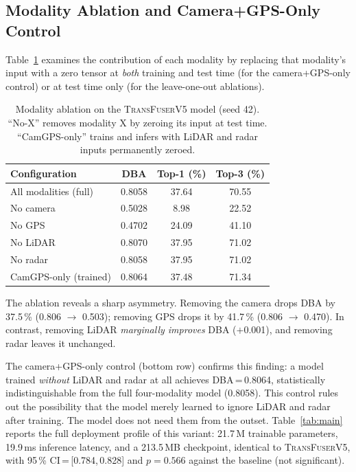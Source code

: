 \documentclass[journal,10pt,twoside]{IEEEtran}
\newcommand{\ours}{\textsc{TransFuserV5}}
\begin{document}
\subsection{Modality Ablation and Camera+GPS-Only Control}

Table~\ref{tab:ablation} examines the contribution of each modality by
replacing that modality's input with a zero tensor at \emph{both} training
and test time (for the camera+GPS-only control) or at test time only
(for the leave-one-out ablations).

\begin{table}[t]
\centering
\caption{%
  Modality ablation on the \ours{} model (seed 42). ``No-X'' removes modality X
  by zeroing its input at test time. ``CamGPS-only'' trains and infers with
  LiDAR and radar inputs permanently zeroed.%
}
\label{tab:ablation}
\renewcommand{\arraystretch}{1.15}
\begin{tabular}{lccc}
\toprule
\textbf{Configuration} & \textbf{DBA} & \textbf{Top-1 (\%)} & \textbf{Top-3 (\%)} \\
\midrule
All modalities (full)  & 0.8058 & 37.64 & 70.55 \\
\midrule
No camera              & 0.5028 & 8.98  & 22.52 \\
No GPS                 & 0.4702 & 24.09 & 41.10 \\
No LiDAR               & 0.8070 & 37.95 & 71.02 \\
No radar               & 0.8058 & 37.95 & 71.02 \\
\midrule
CamGPS-only (trained)  & 0.8064 & 37.48 & 71.34 \\
\bottomrule
\end{tabular}
\end{table}

The ablation reveals a sharp asymmetry. Removing the camera drops DBA by
37.5\,\% (0.806 $\to$ 0.503); removing GPS drops it by 41.7\,\% (0.806 $\to$
0.470). In contrast, removing LiDAR \emph{marginally improves} DBA
($+$0.001), and removing radar leaves it unchanged.

The camera+GPS-only control (bottom row) confirms this finding: a model
trained \emph{without} LiDAR and radar at all achieves DBA\,=\,0.8064,
statistically indistinguishable from the full four-modality model (0.8058).
This control rules out the possibility that the model merely learned to ignore
LiDAR and radar after training. The model does not need them from the outset.
Table~\ref{tab:main} reports the full deployment profile of this variant:
21.7\,M trainable parameters, 19.9\,ms inference latency, and a 213.5\,MB
checkpoint, identical to \ours{}, with 95\,\% CI\,=\,[0.784,\,0.828]
and $p=0.566$ against the baseline (not significant).
\end{document}
